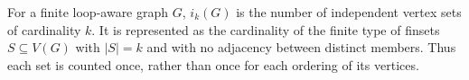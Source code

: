 \begin{definition}
For a finite loop-aware graph $G$, $i_k(G)$ is the number of independent
vertex sets of cardinality $k$.  It is represented as the cardinality of the
finite type of finsets $S\subseteq V(G)$ with $|S|=k$ and with no adjacency
between distinct members.  Thus each set is counted once, rather than once
for each ordering of its vertices.
\end{definition}
